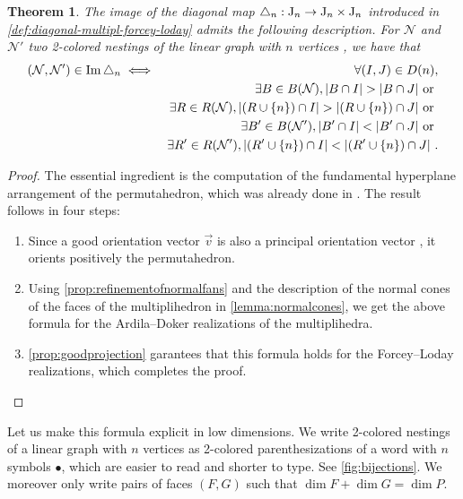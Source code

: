 \documentclass[twoside, 12pt]{amsart}
\newtheorem{theorem}{Theorem}
\theoremstyle{remark}
\begin{document}
\begin{theorem}
\label{thm:formuladiagonal}
The image of the diagonal map $\triangle_n : \mathrm{J}_n \to \mathrm{J}_n \times \mathrm{J}_n$ introduced in \cref{def:diagonal-multipl-forcey-loday} admits the following description.
For $\mathcal{N}$ and $\mathcal{N}'$ two 2-colored nestings of the linear graph with $n$ vertices , we have that
\begin{eqnarray*}
  (\mathcal{N},\mathcal{N}') \in \Ima\triangle_n 
  & \iff & \forall (I,J) \in D(n), \\
  && \exists B \in B(\mathcal{N}), |B\cap I|>|B\cap J| \text{ or }  \\
  && \exists R \in R(\mathcal{N}), |(R\cup \{n\}) \cap I|>| (R\cup \{n\}) \cap J| \text{ or }  \\
  && \exists B' \in B(\mathcal{N}'), |B'\cap I|<|B'\cap J| \text{ or } \nonumber \\
  && \exists R' \in R(\mathcal{N}'), |(R'\cup \{n\}) \cap I|<| (R'\cup \{n\}) \cap J| \ .
\end{eqnarray*}
\end{theorem}

\begin{proof} 
The essential ingredient is the computation of the fundamental hyperplane arrangement of the permutahedron, which was already done in \cite[Section 3.1]{LA21}. The result follows in four steps:
\begin{enumerate}[leftmargin=*]
\item Since a good orientation vector $\vec v$ is also a principal orientation vector \cite[Definition 3.15]{LA21}, it orients positively the permutahedron. 
\item Using \cref{prop:refinementofnormalfans} and the description of the normal cones of the faces of the multiplihedron in \cref{lemma:normalcones}, we get the above formula for the Ardila--Doker realizations of the multiplihedra. 
\item \cref{prop:goodprojection} garantees that this formula holds for the Forcey--Loday realizations, which completes the proof.
\end{enumerate}
\end{proof}

Let us make this formula explicit in low dimensions. 
We write 2-colored nestings of a linear graph with $n$ vertices as 2-colored parenthesizations of a word with $n$ symbols $\bullet$, which are easier to read and shorter to type. See \cref{fig:bijections}. 
We moreover only write pairs of faces $(F,G)$ such that $\dim F + \dim G = \dim P$. 
\end{document}
